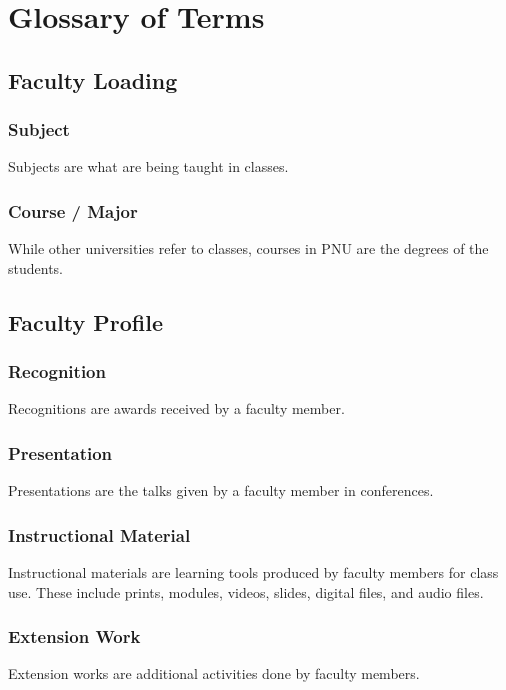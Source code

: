 \chapter{Glossary of Terms}

\section{Faculty Loading}

    \subsection{Subject}
    Subjects are what are being taught in classes.
    
    \subsection{Course / Major}
    While other universities refer to classes, courses in PNU are the degrees of the students.

\section{Faculty Profile}

    \subsection{Recognition}
    Recognitions are awards received by a faculty member.

    \subsection{Presentation}
    Presentations are the talks given by a faculty member in conferences.

    \subsection{Instructional Material}
    Instructional materials are learning tools produced by faculty members for class use. These include prints, modules, videos, slides, digital files, and audio files.

    \subsection{Extension Work}
    Extension works are additional activities done by faculty members.